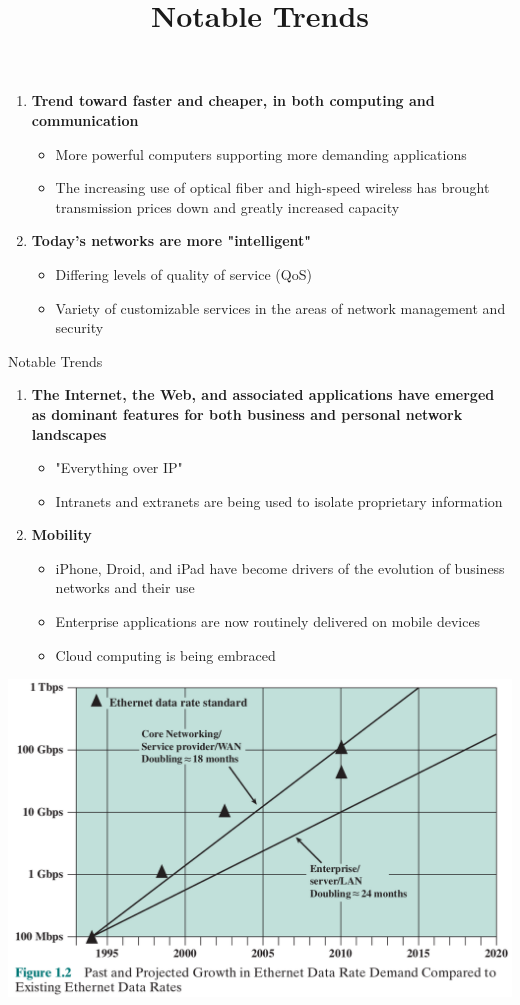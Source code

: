 \documentclass[pdflatex,compress]{beamer}
\begin{document}
\begin{frame}
	\title{Notable Trends}
	\begin{enumerate}
		\item \textbf{Trend toward faster and cheaper, in both computing and communication}
		\begin{itemize}
			\item More powerful computers supporting more demanding applications
			\item The increasing use of optical fiber and high-speed wireless has brought transmission prices down and greatly increased capacity
		\end{itemize}
		\item \textbf{Today's networks are more "intelligent"}
		\begin{itemize}
			\item Differing levels of quality of service (QoS)
			\item Variety of customizable services in the areas of network management and security
		\end{itemize}
	\end{enumerate}
\end{frame}

\begin{frame}{Notable Trends}
	\begin{enumerate}
		\item \textbf{The Internet, the Web, and associated applications have emerged as dominant features for both business and personal network landscapes}
		\begin{itemize}
			\item "Everything over IP"
			\item Intranets and extranets are being used to isolate proprietary information
		\end{itemize}
		\item \textbf{Mobility}
		\begin{itemize}
			\item iPhone, Droid, and iPad have become drivers of the evolution of business networks and their use
			\item Enterprise applications are now routinely delivered on mobile devices
			\item Cloud computing is being embraced
		\end{itemize}
	\end{enumerate}
\end{frame}

\begin{frame}
	\begin{center}
		\includegraphics[height=0.8\textheight]{img/img03}
	\end{center}
\end{frame}
\end{document}
